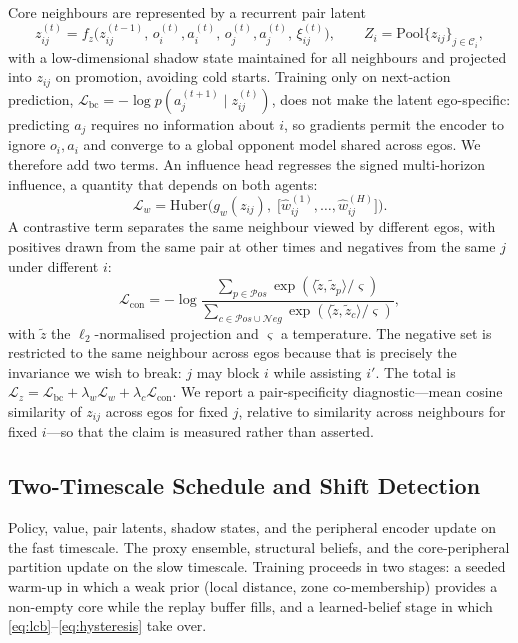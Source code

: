 \documentclass[conference]{IEEEtran}
\begin{document}
Core neighbours are represented by a recurrent pair latent
\begin{equation}
z^{(t)}_{ij}=f_z\big(z^{(t-1)}_{ij},\,o_i^{(t)},a_i^{(t)},\,o_j^{(t)},a_j^{(t)},\,\xi^{(t)}_{ij}\big),
\qquad Z_i=\mathrm{Pool}\{z_{ij}\}_{j\in\mathcal{C}_i},
\label{eq:zij}
\end{equation}
with a low-dimensional shadow state maintained for all neighbours and projected into $z_{ij}$ on promotion, avoiding cold starts. Training only on next-action prediction, $\mathcal{L}_{\mathrm{bc}}=-\log p(a^{(t+1)}_j\mid z^{(t)}_{ij})$, does not make the latent ego-specific: predicting $a_j$ requires no information about $i$, so gradients permit the encoder to ignore $o_i,a_i$ and converge to a global opponent model shared across egos. We therefore add two terms. An influence head regresses the signed multi-horizon influence, a quantity that depends on both agents:
\begin{equation}
\mathcal{L}_{w}=\mathrm{Huber}\Big(g_w(z_{ij}),\;\big[\hat{w}^{(1)}_{ij},\dots,\hat{w}^{(H)}_{ij}\big]\Big).
\label{eq:lw}
\end{equation}
A contrastive term separates the same neighbour viewed by different egos, with positives drawn from the same pair at other times and negatives from the same $j$ under different $i$:
\begin{equation}
\mathcal{L}_{\mathrm{con}}=-\log\frac{\sum_{p\in\mathcal{P}os}\exp(\langle \tilde{z},\tilde{z}_p\rangle/\varsigma)}{\sum_{c\in\mathcal{P}os\cup\mathcal{N}eg}\exp(\langle \tilde{z},\tilde{z}_c\rangle/\varsigma)},
\label{eq:lcon}
\end{equation}
with $\tilde{z}$ the $\ell_2$-normalised projection and $\varsigma$ a temperature. The negative set is restricted to the same neighbour across egos because that is precisely the invariance we wish to break: $j$ may block $i$ while assisting $i'$. The total is $\mathcal{L}_z=\mathcal{L}_{\mathrm{bc}}+\lambda_w\mathcal{L}_w+\lambda_c\mathcal{L}_{\mathrm{con}}$. We report a pair-specificity diagnostic---mean cosine similarity of $z_{ij}$ across egos for fixed $j$, relative to similarity across neighbours for fixed $i$---so that the claim is measured rather than asserted.

\subsection{Two-Timescale Schedule and Shift Detection}
\label{sec:trigger}

Policy, value, pair latents, shadow states, and the peripheral encoder update on the fast timescale. The proxy ensemble, structural beliefs, and the core-peripheral partition update on the slow timescale. Training proceeds in two stages: a seeded warm-up in which a weak prior (local distance, zone co-membership) provides a non-empty core while the replay buffer fills, and a learned-belief stage in which \eqref{eq:lcb}--\eqref{eq:hysteresis} take over.
\end{document}
